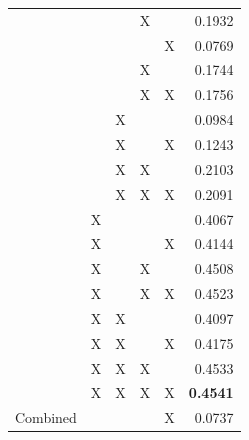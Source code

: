 \begin{longtable}{l|c|c|c|c|r}
                           &           &           & X    &         & 0.1932                           \\ \cline{2-6} 
                           &           &           &      & X       & 0.0769                           \\ \cline{2-6} 
                           &           &           & X    &         & 0.1744                           \\ \cline{2-6} 
                           &           &           & X    & X       & 0.1756                           \\ \cline{2-6} 
                           &           & X         &      &         & 0.0984                           \\ \cline{2-6} 
                           &           & X         &      & X       & 0.1243                           \\ \cline{2-6} 
                           &           & X         & X    &         & 0.2103                           \\ \cline{2-6} 
                           &           & X         & X    & X       & 0.2091                           \\ \cline{2-6} 
                           & X         &           &      &         & 0.4067                           \\ \cline{2-6} 
                           & X         &           &      & X       & 0.4144                           \\ \cline{2-6} 
                           & X         &           & X    &         & 0.4508                           \\ \cline{2-6} 
                           & X         &           & X    & X       & 0.4523                           \\ \cline{2-6} 
                           & X         & X         &      &         & 0.4097                           \\ \cline{2-6} 
                           & X         & X         &      & X       & 0.4175                           \\ \cline{2-6} 
                           & X         & X         & X    &         & 0.4533                           \\ \cline{2-6} 
                           & X         & X         & X    & X       & \textbf{0.4541}                           \\ \hline
\multirow{15}{*}{Combined} &           &           &      & X       & 0.0737                           \\ \cline{2-6} 

\end{longtable}
